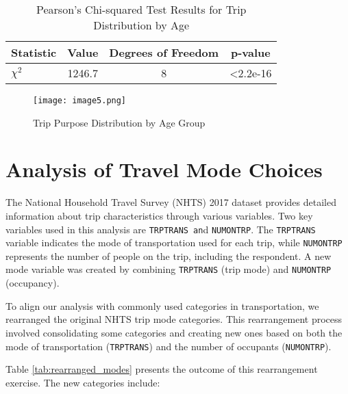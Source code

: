 \begin{table}[h!]
    \centering
    \caption{Pearson's Chi-squared Test Results for Trip Distribution by Age}
    \label{tab:Pearson's Chi-squared Test Results for Trip Distribution by Age}
    \begin{tabular}{lccc}
    \toprule
      Statistic & Value & Degrees of Freedom & p-value \\
    \midrule
     \(\chi^2\) & 1246.7 & 8 & \textless 2.2e-16 \\
    \bottomrule
    \end{tabular}
\end{table}

\begin{figure}[h!]
    \centering
    \texttt{[image: image5.png]}
    \caption{Trip Purpose Distribution by Age Group}
    \label{fig:enter-label}
\end{figure}

\newpage
\section{Analysis of Travel Mode Choices}

The National Household Travel Survey (NHTS) 2017 dataset provides detailed information about trip characteristics through various variables. Two key variables used in this analysis are \texttt{TRPTRANS an}d \texttt{NUMONTRP}. The \texttt{TRPTRANS} variable indicates the mode of transportation used for each trip, while \texttt{NUMONTRP} represents the number of people on the trip, including the respondent. A new mode variable was created by combining \texttt{TRPTRANS} (trip mode) and \texttt{NUMONTRP} (occupancy).

To align our analysis with commonly used categories in transportation, we rearranged the original NHTS trip mode categories. This rearrangement process involved consolidating some categories and creating new ones based on both the mode of transportation (\texttt{TRPTRANS}) and the number of occupants (\texttt{NUMONTRP}).

Table \ref{tab:rearranged_modes} presents the outcome of this rearrangement exercise. The new categories include:

